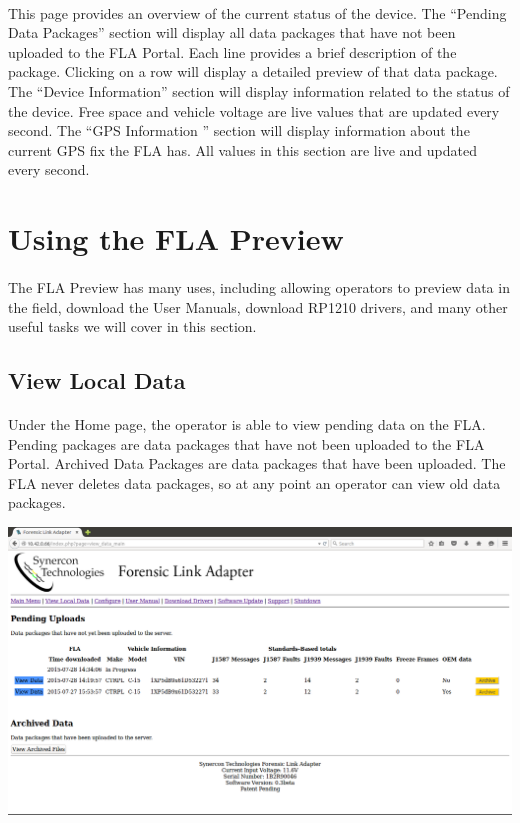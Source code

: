 \documentclass[11pt, oneside]{book}
\begin{document}
\paragraph{  }
This page provides an overview of the current status of the device. The ``Pending Data Packages'' section will display all data packages that have not been uploaded to the FLA Portal. Each line provides a brief description of the package. Clicking on a row will display a detailed preview of that data package. The ``Device Information'' section will display information related to the status of the device. Free space and vehicle voltage are live values that are updated every second. The ``GPS Information '' section will display information about the current GPS fix the FLA has. All values in this section are live and updated every second.


\section{Using the FLA Preview}
\paragraph{  }
The FLA Preview has many uses, including allowing operators to preview data in the field, download the User Manuals, download RP1210 drivers, and many other useful tasks we will cover in this section.


\subsection{View Local Data}
\paragraph{  }
Under the Home page, the operator is able to view pending data
on the FLA. Pending packages are data packages that have not been uploaded to the FLA Portal. Archived Data Packages are data packages
that have been uploaded. The FLA never deletes data packages, so at any point an operator can view old data packages.
\begin{center}
\includegraphics[width=.9\linewidth]{../media/fla_preview_screenshots/local_data}
\end{center}
\end{document}
